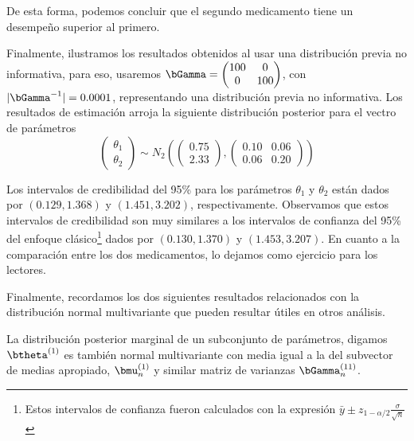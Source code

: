 \documentclass[10pt,openright]{book}\usepackage[]{graphicx}\usepackage[]{color}
\newenvironment{knitrout}{}{} %
\begin{document}
\begin{Eje}
\begin{knitrout}
\end{knitrout}

De esta forma, podemos concluir que el segundo medicamento tiene un desempe\~no superior al primero.

Finalmente, ilustramos los resultados obtenidos al usar una distribuci\'on previa no informativa, para eso, usaremos $\bGamma=\begin{pmatrix}100&0\\ 0&100\end{pmatrix}$, con $|\bGamma^{-1}|=0.0001$, representando una distribuci\'on previa no informativa. Los resultados de estimaci\'on arroja la siguiente distribuci\'on posterior para el vectro de par\'ametros 
\begin{equation*}
\begin{pmatrix}
\theta_1\\
\theta_2
\end{pmatrix}
\sim N_2\left(\begin{pmatrix}
0.75\\
2.33
\end{pmatrix},\begin{pmatrix}
0.10&0.06\\
0.06&0.20
\end{pmatrix}\right)
\end{equation*}

Los intervalos de credibilidad del 95\% para los par\'ametros $\theta_1$ y $\theta_2$ est\'an dados por $(0.129, 1.368)$ y $(1.451, 3.202)$, respectivamente. Observamos que estos intervalos de credibilidad son muy similares a los intervalos de confianza del 95\% del enfoque cl\'asico\footnote{Estos intervalos de confianza fueron calculados con la expresi\'on $\bar{y}\pm z_{1-\alpha/2}\frac{\sigma}{\sqrt{n}}$} dados por $(0.130, 1.370)$ y $(1.453, 3.207)$. En cuanto a la comparaci\'on entre los dos medicamentos, lo dejamos como ejercicio para los lectores.
\end{Eje}


Finalmente, recordamos los dos siguientes resultados relacionados con la distribuci\'on normal multivariante que pueden resultar \'utiles en otros an\'alisis.
\begin{Res}
La distribuci\'on posterior marginal de un subconjunto de par\'ametros, digamos $\btheta^{(1)}$ es tambi\'en normal multivariante con media igual a la del subvector de medias apropiado, $\bmu_n^{(1)}$ y similar matriz de varianzas $\bGamma_n^{(11)}$.
\end{Res}
  
\end{document}
